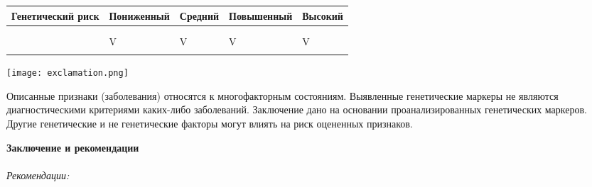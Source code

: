 \documentclass[russian,a4paper,12pt]{article}
\begin{document}
\begin{center}
	\begin{longtable} { |C||p{2.5cm}|p{1.5cm}|p{2.4cm}|p{1.8cm}| }%
		\hline
		Генетический риск & Пониженный 
		& Средний 
		& Повышенный 
		& Высокий \\
		\hline

			 \\
			\hline
				\\
				\hline
					&
					V
					&
					V
					&
					V
					&
					V
					\\
					\hline


	\end{longtable}
\end{center}

\noindent
\parbox[b][3cm][t]{10mm}{
	\texttt{[image: exclamation.png]}}
\hfill
\parbox[b][3cm][t]{100mm}{
	Описанные признаки (заболевания) относятся к многофакторным состояниям. Выявленные генетические маркеры не являются диагностическими критериями каких-либо заболеваний. Заключение дано на основании проанализированных генетических маркеров. Другие генетические и не генетические факторы могут влиять на риск оцененных признаков.}

\vspace{15mm}

\textbf{Заключение и рекомендации}\\
	\textbf{}\\
	\textit{Рекомендации:}
					\\
\end{document}
